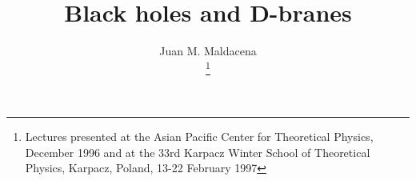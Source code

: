%

\topmargin      -10mm   
\newcommand{\ttbs}{\char'134}
\newcommand{\AmS}{{\protect\the\textfont2
  A\kern-.1667em\lower.5ex\hbox{M}\kern-.125emS}}


\title{Black holes and D-branes
}

\author{Juan M. Maldacena\address{Department of Physics and Astronomy, 
        Rutgers University, \\ 
        Piscataway, NJ, 08855, USA}%
        \thanks{Lectures presented at the Asian Pacific Center for 
Theoretical Physics, December 1996 and at the 33rd Karpacz Winter  
        School of Theoretical Physics, Karpacz, Poland, 13-22 February
1997 
              }
       } 


\def\be{\begin{equation}}
\def\ee{\end{equation}}
\newcommand{\la}[1]{\label{#1}}
\def\ba{\begin{array}}
\def\ea{\end{array}}
\newcommand{\refnew}[1]{(\ref{#1})}


\def\mn{\mu\nu}
\def\sq2{\sqrt{2}}
\def\ra{\rightarrow}
\def\quart{{1\over4}}
\def\p{\partial}
\def\ket#1{|#1\rangle}
\def\bra#1{\langle#1|}
\def\grad{\vec \nabla}
\def\bp{\bar \p}
\def\RN{Reissner-Nordstr{\o}m}
\def\apm{\alpha'}
\def\at{{\tilde \alpha}}
\def\s42{ 2^{-{1\over 4} } }
\def\shalf{{\scriptscriptstyle{1\over2}}}
\def\sign{{\rm sign}}
\def\csc{closed string channel}
\def\osc{open string channel}
\def\cL{{\cal L}}
\def\goto#1{\mathrel {\mathop {\longrightarrow} \limits_{#1}}}
\def\lr{\goto{r\to\infty}}
\def\exp{{\rm exp}}
\def\lb{\left\langle}
\def\rb{\right\rangle}
\def\ie{i\epsilon}
\def\ra{\rightarrow}
\def\propaga#1{\left({\theta_1(#1) \over \theta_4(#1)} \right) }
\def\propp{\left({\theta'_1(0) \over \theta_4(0)}\right) }
\def\g{\gamma}
\def\gb{\bar{\gamma}}
\def\a{\alpha}
\def\sa{r_0^2 {\rm sinh}^2\alpha }
\def\sg{r_0^2 {\rm sinh}^2\gamma }
\def\ss{r_0^2 {\rm sinh}^2\sigma }
\def\ca{r_0^2 {\rm cosh}^2\alpha }
\def\cg{r_0^2 {\rm cosh}^2\gamma }
\def\cs{r_0^2 {\rm cosh}^2\sigma }
\def\[{\left [}
\def\]{\right ]}
\def\({\left (}
\def\){\right )}
\def\b{\beta}


